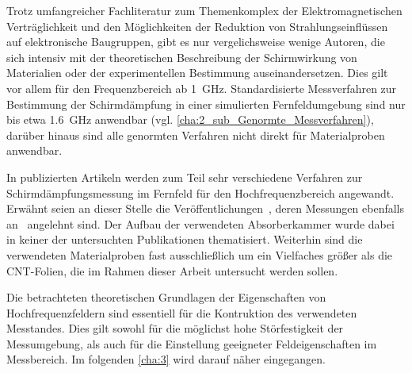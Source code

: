
Trotz umfangreicher Fachliteratur zum Themenkomplex der Elektromagnetischen Verträglichkeit und den Möglichkeiten der Reduktion von Strahlungseinflüssen auf elektronische Baugruppen, gibt es nur vergelichsweise wenige Autoren, die sich intensiv mit der theoretischen Beschreibung der Schirmwirkung von Materialien oder der experimentellen Bestimmung auseinandersetzen. Dies gilt vor allem für den Frequenzbereich ab \SI{1}{\giga\hertz}. Standardisierte Messverfahren zur Bestimmung der Schirmdämpfung in einer simulierten Fernfeldumgebung sind nur bis etwa \SI{1,6}{\giga\hertz} anwendbar (vgl. \Abschnitt\ref{cha:2_sub_Genormte_Messverfahren}), darüber hinaus sind alle genormten Verfahren nicht direkt für Materialproben anwendbar. 
\par
\vspace{\linespace}
In publizierten Artikeln werden zum Teil sehr verschiedene Verfahren zur Schirmdämpfungsmessung im Fernfeld für den Hochfrequenzbereich angewandt. Erwähnt seien an dieser Stelle die Veröffentlichungen~\cite{Measurement_Shielding_Textile_Materials_Free_Space_Transmission, Predicted_and_Measured_EMI_Effectiveness_Metallic_Mesh_on_Window}, deren Messungen ebenfalls an~\cite{DIN_EN_61000-5-7, IEEE_299} angelehnt sind. Der Aufbau der verwendeten Absorberkammer wurde dabei in keiner der untersuchten Publikationen thematisiert. Weiterhin sind die verwendeten Materialproben fast ausschließlich um ein Vielfaches größer als die CNT-Folien, die im Rahmen dieser Arbeit untersucht werden sollen.
\par
\vspace{\linespace}
Die betrachteten theoretischen Grundlagen der Eigenschaften von Hochfrequenzfeldern sind essentiell für die Kontruktion des verwendeten Messtandes. Dies gilt sowohl für die möglichst hohe Störfestigkeit der Messumgebung, als auch für die Einstellung geeigneter Feldeigenschaften im Messbereich. Im folgenden \Kapitel\ref{cha:3} wird darauf näher eingegangen.







